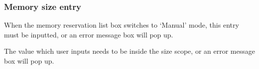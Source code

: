 \documentclass{article}
\begin{document}
\subsubsection{Memory size entry}
\noindent
When the memory reservation list box switches to `Manual' mode, this entry must
be inputted, or an error message box will pop up.\\
\begin{figure}[H]        
\end{figure}
\noindent
The value which user inputs needs to be inside the size scope, or an error
message box will pop up.
\begin{figure}[H]        
\end{figure}
\end{document}
